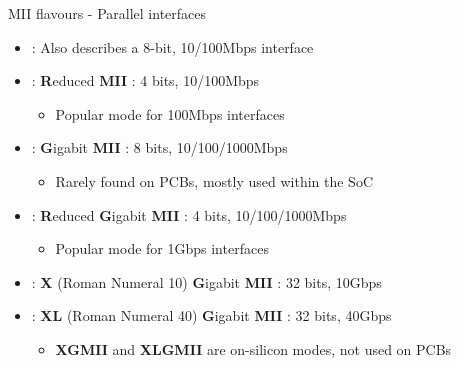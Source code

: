 \begin{frame}{MII flavours - Parallel interfaces}
	\begin{itemize}
		\item {} : Also describes a 8-bit, 10/100Mbps interface
		\item {} : \textbf{R}educed \textbf{MII} : 4 bits, 10/100Mbps
			\begin{itemize}
				\item Popular mode for 100Mbps interfaces
			\end{itemize}
		\item {} : \textbf{G}igabit \textbf{MII} : 8 bits, 10/100/1000Mbps
			\begin{itemize}
				\item Rarely found on PCBs, mostly used within the SoC
			\end{itemize}
		\item {} : \textbf{R}educed \textbf{G}igabit \textbf{MII} : 4 bits, 10/100/1000Mbps
			\begin{itemize}
				\item Popular mode for 1Gbps interfaces
			\end{itemize}
		\item {} : \textbf{X} (Roman Numeral 10) \textbf{G}igabit \textbf{MII} : 32 bits, 10Gbps
		\item {} : \textbf{XL} (Roman Numeral 40) \textbf{G}igabit \textbf{MII} : 32 bits, 40Gbps
			\begin{itemize}
				\item \textbf{XGMII} and \textbf{XLGMII} are on-silicon modes, not used on PCBs
			\end{itemize}
	\end{itemize}
\end{frame}

